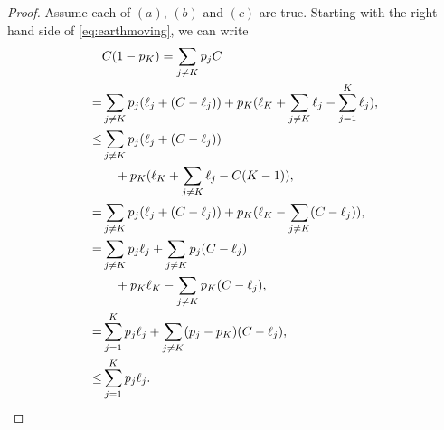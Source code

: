 \documentclass[letterpaper]{article} %
\begin{document}
\begin{proof}
    Assume each of $(a)$, $(b)$ and $(c)$ are true. 
    Starting with the right hand side of \eqref{eq:earthmoving}, we can write
    \begin{align*}
        & C(1-p_K) = \sum_{j\ne K} p_j C
        \\
        = & \sum_{j\ne K} p_j (\ell_j + (C-\ell_j)) 
        + p_K 
        (
            \ell_K + \sum_{j\ne K}\ell_j - \sum_{j=1}^K\ell_j
        ), 
        \\
        \leq & \sum_{j\ne K} p_j (\ell_j + (C-\ell_j)) 
        \\
        &\quad + p_K 
        (
            \ell_K + \sum_{j\ne K}\ell_j - C(K-1)
        ),
        \\
        =& \sum_{j\ne K} p_j (\ell_j + (C-\ell_j)) + p_K (\ell_K - \sum_{j\ne K}(C-\ell_j)),  
        \\
        =& \sum_{j\ne K} p_j \ell_j + \sum_{j\ne K} p_j(C-\ell_j) 
        \\
        &\quad + p_K \ell_K - \sum_{j\ne K}p_K(C-\ell_j),  
        \\
        =& \sum_{j=1}^K p_j \ell_j + \sum_{j\ne K} (p_j-p_K)(C-\ell_j),  
        \\
        \leq & \sum_{j=1}^K p_j \ell_j. \qedhere
    \end{align*}
\end{proof}
\end{document}
